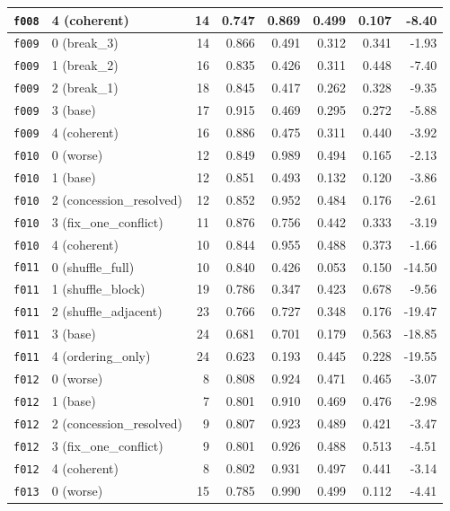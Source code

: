 \documentclass[11pt]{article}
\begin{document}
\begin{table}[htbp]
\begin{tabular}{llrrrrrr}
\texttt{f008} & 4 (coherent) & 14 & 0.747 & 0.869 & 0.499 & 0.107 & -8.40 \\
\midrule
\texttt{f009} & 0 (break\_3) & 14 & 0.866 & 0.491 & 0.312 & 0.341 & -1.93 \\
\texttt{f009} & 1 (break\_2) & 16 & 0.835 & 0.426 & 0.311 & 0.448 & -7.40 \\
\texttt{f009} & 2 (break\_1) & 18 & 0.845 & 0.417 & 0.262 & 0.328 & -9.35 \\
\texttt{f009} & 3 (base) & 17 & 0.915 & 0.469 & 0.295 & 0.272 & -5.88 \\
\texttt{f009} & 4 (coherent) & 16 & 0.886 & 0.475 & 0.311 & 0.440 & -3.92 \\
\midrule
\texttt{f010} & 0 (worse) & 12 & 0.849 & 0.989 & 0.494 & 0.165 & -2.13 \\
\texttt{f010} & 1 (base) & 12 & 0.851 & 0.493 & 0.132 & 0.120 & -3.86 \\
\texttt{f010} & 2 (concession\_resolved) & 12 & 0.852 & 0.952 & 0.484 & 0.176 & -2.61 \\
\texttt{f010} & 3 (fix\_one\_conflict) & 11 & 0.876 & 0.756 & 0.442 & 0.333 & -3.19 \\
\texttt{f010} & 4 (coherent) & 10 & 0.844 & 0.955 & 0.488 & 0.373 & -1.66 \\
\midrule
\texttt{f011} & 0 (shuffle\_full) & 10 & 0.840 & 0.426 & 0.053 & 0.150 & -14.50 \\
\texttt{f011} & 1 (shuffle\_block) & 19 & 0.786 & 0.347 & 0.423 & 0.678 & -9.56 \\
\texttt{f011} & 2 (shuffle\_adjacent) & 23 & 0.766 & 0.727 & 0.348 & 0.176 & -19.47 \\
\texttt{f011} & 3 (base) & 24 & 0.681 & 0.701 & 0.179 & 0.563 & -18.85 \\
\texttt{f011} & 4 (ordering\_only) & 24 & 0.623 & 0.193 & 0.445 & 0.228 & -19.55 \\
\midrule
\texttt{f012} & 0 (worse) & 8 & 0.808 & 0.924 & 0.471 & 0.465 & -3.07 \\
\texttt{f012} & 1 (base) & 7 & 0.801 & 0.910 & 0.469 & 0.476 & -2.98 \\
\texttt{f012} & 2 (concession\_resolved) & 9 & 0.807 & 0.923 & 0.489 & 0.421 & -3.47 \\
\texttt{f012} & 3 (fix\_one\_conflict) & 9 & 0.801 & 0.926 & 0.488 & 0.513 & -4.51 \\
\texttt{f012} & 4 (coherent) & 8 & 0.802 & 0.931 & 0.497 & 0.441 & -3.14 \\
\midrule
\texttt{f013} & 0 (worse) & 15 & 0.785 & 0.990 & 0.499 & 0.112 & -4.41 \\

\end{tabular}
\end{table}
\end{document}
